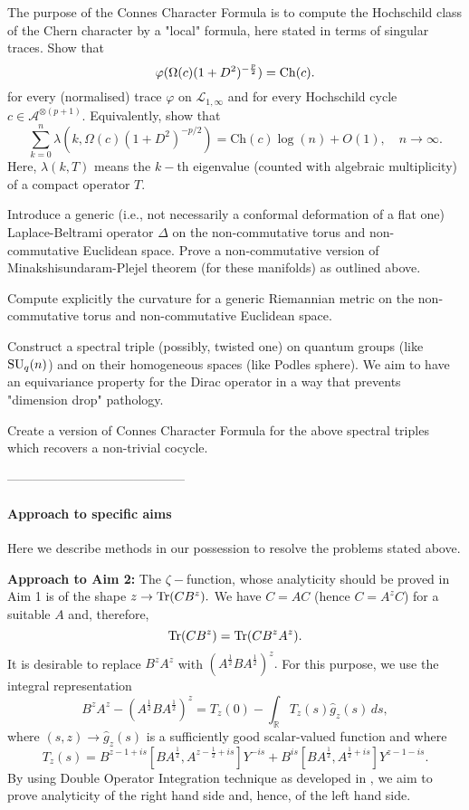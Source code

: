 \documentclass{article}
\begin{document}
 The purpose of the Connes Character Formula is to compute the Hochschild class of the Chern character by a "local" formula, here stated in terms of singular traces. Show that
\begin{equation}\label{super main eq}
\varphi(\Omega(c)(1+D^2)^{-\frac{p}{2}})={\rm Ch}(c).
\end{equation}
for every (normalised) trace $\varphi$ on $\mathcal{L}_{1,\infty}$ and for every Hochschild cycle $c\in\mathcal{A}^{\otimes (p+1)}.$ Equivalently, show that
$$\sum_{k=0}^n \lambda(k,\Omega(c)(1+D^2)^{-p/2}) = \mathrm{Ch}(c)\log(n)+O(1),\quad n\to\infty.$$
Here, $\lambda(k,T)$ means the $k-$th eigenvalue (counted with algebraic multiplicity) of a compact operator $T.$

 Introduce a generic (i.e., not necessarily a conformal deformation of a flat one) Laplace-Beltrami operator $\Delta$ on the non-commutative torus and non-commutative Euclidean space. Prove a non-commutative version of Minakshisundaram-Plejel theorem (for these manifolds) as outlined above.

 Compute explicitly the curvature for a generic Riemannian metric on the non-commutative torus and non-commutative Euclidean space.

 Construct a spectral triple (possibly, twisted one) on quantum groups (like ${\rm SU}_q(n)$) and on their homogeneous spaces (like Podles sphere). We aim to have an equivariance property for the Dirac operator in a way that prevents "dimension drop" pathology.

 Create a version of Connes Character Formula for the above spectral triples which recovers a non-trivial cocycle.

------------------------------------------

\paragraph*{Approach to specific aims} Here we describe methods in our possession to resolve the problems stated above.

{\bf Approach to Aim 2:} The $\zeta-$function, whose analyticity should be proved in Aim 1 is of the shape $z\to {\rm Tr}(CB^z).$ We have $C=AC$ (hence $C=A^zC$) for a suitable $A$ and, therefore,
$${\rm Tr}(CB^z)={\rm Tr}(CB^zA^z).$$
It is desirable to replace $B^zA^z$ with $(A^{\frac12}BA^{\frac12})^z.$ For this purpose, we use the integral representation
$$B^zA^z-(A^{\frac{1}{2}}BA^{\frac{1}{2}})^z = T_z(0)-\int_{\mathbb{R}} T_z(s)\widehat{g}_z(s)\,ds,$$ 
where $(s,z)\to\widehat{g}_z(s)$ is a sufficiently good scalar-valued function and where
$$T_z(s)= B^{z-1+is}[BA^{\frac{1}{2}},A^{z-\frac{1}{2}+is}]Y^{-is}+B^{is}[BA^{\frac{1}{2}},A^{\frac{1}{2}+is}]Y^{z-1-is}.$$
By using Double Operator Integration technique as developed in \cite{PotapovSukochev}, we aim to prove analyticity of the right hand side and, hence, of the left hand side.
\end{document}
